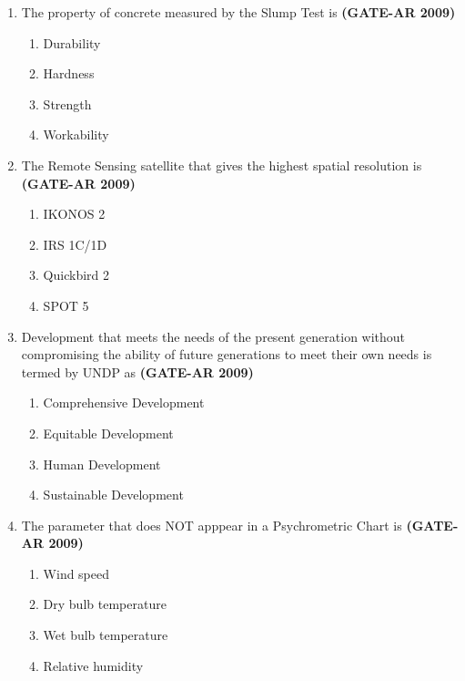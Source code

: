 \documentclass[a4paper,10pt]{article}
\begin{document}
\begin{enumerate}
    \item The property of concrete measured by the Slump Test is \hfill \textbf{(GATE-AR 2009)}
    \begin{multicols}{4}
	\begin{enumerate}
        \item Durability
        \item Hardness
        \item Strength
        \item Workability
    \end{enumerate}
	\end{multicols}
    
    \item The Remote Sensing satellite that gives the highest spatial resolution is \hfill \textbf{(GATE-AR 2009)}
    \begin{multicols}{4}
	\begin{enumerate}
        \item IKONOS 2
        \item IRS 1C/1D
        \item Quickbird 2
        \item SPOT 5
    \end{enumerate}
	\end{multicols}
    
    \item Development that meets the needs of the present generation without compromising the ability of future generations to meet their own needs is termed by UNDP as \hfill \textbf{(GATE-AR 2009)}
    \begin{multicols}{2}
	\begin{enumerate}
        \item Comprehensive Development
        \item Equitable Development
        \item Human Development
        \item Sustainable Development
    \end{enumerate}
	\end{multicols}

	\item The parameter that does NOT apppear in a Psychrometric Chart is \hfill \textbf{(GATE-AR 2009)}
    \begin{multicols}{2}
	\begin{enumerate}
        \item Wind speed
        \item Dry bulb temperature
        \item Wet bulb temperature
        \item Relative humidity
    \end{enumerate}
	\end{multicols}


\end{enumerate}
\end{document}
